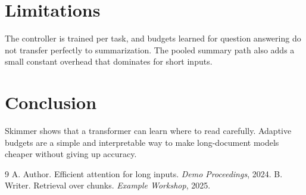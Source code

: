 \documentclass[10pt,twocolumn]{article}
\begin{document}
\section{Limitations}
The controller is trained per task, and budgets learned for question answering do not transfer perfectly to summarization. The pooled summary path also adds a small constant overhead that dominates for short inputs.

\section{Conclusion}
Skimmer shows that a transformer can learn where to read carefully. Adaptive budgets are a simple and interpretable way to make long-document models cheaper without giving up accuracy.

\begin{thebibliography}{9}\small
{} A. Author. Efficient attention for long inputs. \emph{Demo Proceedings}, 2024.
 B. Writer. Retrieval over chunks. \emph{Example Workshop}, 2025.
\end{thebibliography}
\end{document}
